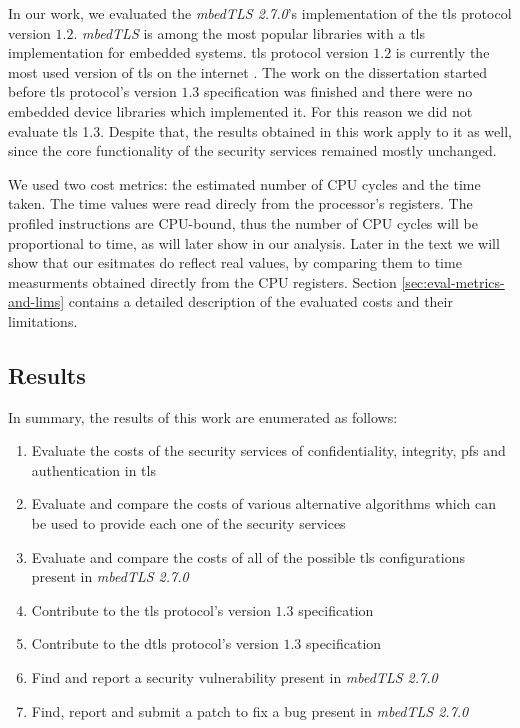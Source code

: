 \documentclass{llncs}
\begin{document}
In our work, we evaluated the \textit{mbedTLS 2.7.0}'s\cite{SSLLibra13:online} implementation of the \gls{tls} protocol version $1.2$.
\textit{mbedTLS} is among the most popular libraries with a \gls{tls} implementation for embedded systems. \gls{tls} protocol 
version $1.2$ is currently the most used version of \gls{tls} on the internet \cite{QualysSS90:online}. The work on
the dissertation started before \gls{tls} protocol's version $1.3$ specification was finished and there were no embedded device
libraries which implemented it.  For this reason we did not evaluate \gls{tls} 1.3. Despite that, the results
obtained in this work apply to it as well, since the core functionality of the security services remained mostly unchanged.

We used two cost metrics: the estimated number of CPU cycles and the time taken. The time values were read direcly from
the processor's registers. The profiled instructions are CPU-bound, thus the number of CPU cycles will be proportional to time,
as will later show in our analysis. Later in the text we will show that our esitmates do reflect real values, by comparing them to time
measurments obtained directly from the CPU registers. Section \ref{sec:eval-metrics-and-lims} contains a detailed description of the 
evaluated costs and their limitations.

\subsection{Results}

In summary, the results of this work are enumerated as follows:

\begin{enumerate}
  \item Evaluate the costs of the security services of confidentiality, integrity, \gls{pfs} and authentication in \gls{tls}
  \item Evaluate and compare the costs of various alternative algorithms which can be used to provide each one of the security services
  \item Evaluate and compare the costs of all of the possible \gls{tls} configurations present in \textit{mbedTLS 2.7.0}
  \item Contribute to the \gls{tls} protocol's version $1.3$ specification
  \item Contribute to the \gls{dtls} protocol's version $1.3$ specification
  \item Find and report a security vulnerability present in \textit{mbedTLS 2.7.0}
  \item Find, report and submit a patch to fix a bug present in \textit{mbedTLS 2.7.0}
\end{enumerate}
\end{document}
